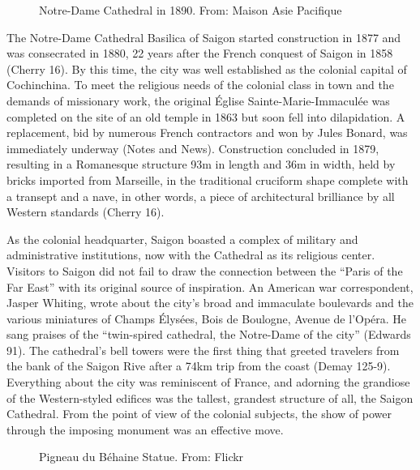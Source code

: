 \begin{figure}[!ht]
\begin{center}
\vspace{-.2 in}
\caption[Notre-Dame Cathedral in 1890]{Notre-Dame Cathedral in 1890. From: Maison Asie Pacifique \en}\label{thienhau_present}
\end{center}
\vspace{-.2 in}
\end{figure}

The Notre-Dame Cathedral Basilica of Saigon started construction in 1877 and was consecrated in 1880, 22 years after the French conquest of Saigon in 1858 (Cherry 16). By this time, the city was well established as the colonial capital of Cochinchina. To meet the religious needs of the colonial class in town and the demands of missionary work, the original Église Sainte-Marie-Immaculée was completed on the site of an old temple in 1863 but soon fell into dilapidation. A replacement, bid by numerous French contractors and won by Jules Bonard, was immediately underway (Notes and News).  Construction concluded in 1879, resulting in a Romanesque structure 93m in length and 36m in width, held by bricks imported from Marseille, in the traditional cruciform shape complete with a transept and a nave, in other words, a piece of architectural brilliance by all Western standards (Cherry 16).

As the colonial headquarter, Saigon boasted a complex of military and administrative institutions, now with the Cathedral as its religious center. Visitors to Saigon did not fail to draw the connection between the “Paris of the Far East” with its original source of inspiration. An American war correspondent, Jasper Whiting, wrote about the city's broad and immaculate boulevards and the various miniatures of Champs Élysées, Bois de Boulogne, Avenue de l’Opéra. He sang praises of the “twin-spired cathedral, the Notre-Dame of the city” (Edwards 91). The cathedral’s bell towers were the first thing that greeted travelers from the bank of the Saigon Rive after a 74km trip from the coast (Demay 125-9). Everything about the city was reminiscent of France, and adorning the grandiose of the Western-styled edifices was the tallest, grandest structure of all, the Saigon Cathedral. From the point of view of the colonial subjects, the show of power through the imposing monument was an effective move. \en

\begin{figure}[!ht]
\begin{center}
\vspace{-.2 in}
\caption[Pigneau du \vi Béhaine Statue \en]{Pigneau du \vi Béhaine Statue. From: Flickr \en}\label{statue_pigneau}
\end{center}
\vspace{-.2 in}
\end{figure}

